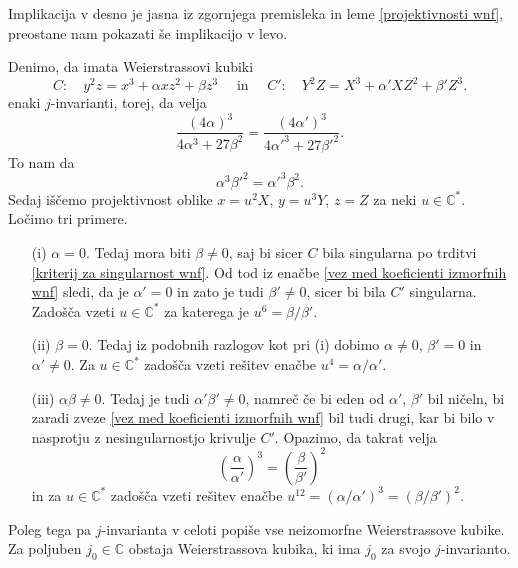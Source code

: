 \documentclass[mat1]{fmfdelo}
\numberwithin{equation}{section}
\newcommand{\C}{\mathbb C}
\newcommand{\CM}{\mathbb C ^*}
\theoremstyle{definition}
\begin{document}
\begin{dokaz}
    Implikacija v desno je jasna iz zgornjega premisleka in leme \ref{projektivnosti wnf}, preostane nam pokazati še implikacijo v levo. 

    Denimo, da imata Weierstrassovi kubiki
    \[
        C: \quad y^2z = x^3 + \alpha xz^2 + \beta z^3 \quad \text{ in } \quad
        C': \quad Y^2Z = X^3 + \alpha' XZ^2 + \beta' Z^3. 
    \]
    enaki $j$-invarianti, torej, da velja
    \[
        \frac{(4\alpha)^3}{4\alpha^3 + 27\beta^2} = \frac{(4\alpha')^3}{4\alpha'^3 + 27\beta'^2}.
    \]
    To nam da
    \begin{equation}
        \label{vez med koeficienti izmorfnih wnf}
        \alpha^3 \beta'^2 = \alpha'^3 \beta^2.
    \end{equation}
    Sedaj iščemo projektivnost oblike 
    $x = u^2 X$, $y = u^3 Y$, $z = Z$ 
    za neki $u \in \CM$. Ločimo tri primere.

    \begin{itemize}
        \item[(i)]
        $\alpha = 0$. Tedaj mora biti $\beta \neq 0$, saj bi sicer $C$ bila singularna po trditvi \ref{kriterij za singularnost wnf}. Od tod iz enačbe \eqref{vez med koeficienti izmorfnih wnf} sledi, da je $\alpha' = 0$ in zato je tudi $\beta' \neq 0$, sicer bi bila $C'$ singularna. Zadošča vzeti $u \in \CM$ za katerega je $u^6 = \beta/\beta'$.
        \item[(ii)]
        $\beta = 0$. Tedaj iz podobnih razlogov kot pri (i) dobimo $\alpha \neq 0$, $\beta' = 0$ in $\alpha' \neq 0$. Za $u \in \CM$ zadošča vzeti rešitev enačbe $u^4 = \alpha/\alpha'$.
        \item[(iii)]
        $\alpha\beta \neq 0$. Tedaj je tudi $\alpha'\beta' \neq 0$, namreč če bi eden od $\alpha'$, $\beta'$ bil ničeln, bi zaradi zveze \eqref{vez med koeficienti izmorfnih wnf} bil tudi drugi, kar bi bilo v nasprotju z nesingularnostjo krivulje $C'$. Opazimo, da takrat velja
        \[
            \left(\frac{\alpha}{\alpha'}\right)^3 = \left(\frac{\beta}{\beta'}\right)^2
        \]
        in za $u \in \CM$ zadošča vzeti rešitev enačbe $u^{12} = (\alpha/\alpha')^3 = (\beta/\beta')^2$. \qedhere
    \end{itemize}
\end{dokaz}

Poleg tega pa $j$-invarianta v celoti popiše vse neizomorfne Weierstrassove kubike. Za poljuben $j_0 \in \C$ obstaja Weierstrassova kubika, ki ima $j_0$ za svojo $j$-invarianto.
\end{document}
